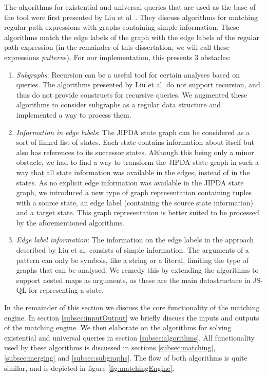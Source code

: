 The algorithms for existential and universal queries that are used as the base of the tool were first presented by Liu et al~\cite{algoEngine}. They discuss algorithms for matching regular path expressions with graphs containing simple information. These algorithms match the edge labels of the graph with the edge labels of the regular path expression (in the remainder of this dissertation, we will call these expressions \textit{pattern}s). For our implementation, this presents 3 obstacles:
\begin{enumerate}
\item \textit{Subgraphs}: Recursion can be a useful tool for certain analyses based on queries. The algorithms presented by Liu et al. do not support recursion, and thus do not provide constructs for recursive queries. We augmented these algorithms to consider subgraphs as a regular data structure and implemented a way to process them.
\item \textit{Information in edge labels}: The JIPDA state graph can be considered as a sort of linked list of states. Each state contains information about itself but also has references to its successor states. Although this being only a minor obstacle, we had to find a way to transform the JIPDA state graph in such a way that all state information was available in the edges, instead of in the states. As no explicit edge information was available in the JIPDA state graph, we introduced a new type of graph representation containing tuples with a source state, an edge label (containing the source state information) and a target state. This graph representation is better suited to be processed by the aforementioned algorithms.
\item \textit{Edge label information}: The information on the edge labels in the approach described by Liu et al. consists of simple information. The arguments of a pattern can only be symbols, like a string or a literal, limiting the type of graphs that can be analysed. We remedy this by extending the algorithms to support nested maps as arguments, as these are the main datastructure in JS-QL for representing a state.
\end{enumerate}


In the remainder of this section we discuss the core functionality of the matching engine. In section \ref{subsec:inputOutput} we briefly discuss the inputs and outputs of the matching engine. We then elaborate on the algorithms for solving existential and universal queries in section \ref{subsec:algorithms}. All functionality used by these algorithms is discussed in sections \ref{subsec:matching}, \ref{subsec:merging} and \ref{subsec:subgraphs}. The flow of both algorithms is quite similar, and is depicted in figure \ref{fig:matchingEngine}.

